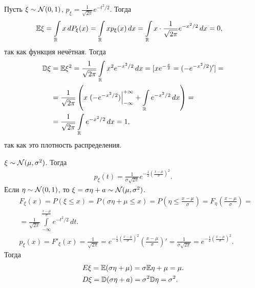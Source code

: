 \documentclass[../main.tex]{subfiles}
\begin{document}
\begin{exmpl}
 Пусть $ \xi \sim \mathcal N(0,1) $,  $ p_\xi = \frac{1}{\sqrt{2\pi}}e^{-t^{2} / 2} $. Тогда
 \begin{align*}
  \mathbb E\xi &= \int\limits_{\mathbb{R}} x\,dP_\xi(x) = \int\limits_{\mathbb{R}} x p_\xi(x)\,dx = \int\limits_{\mathbb{R}} x \cdot \frac{1}{\sqrt{2\pi}}      e^{-x^{2} / 2}\,dx = 0,
 \end{align*} так как функция нечётная. Тогда
 \begin{align*}
  \mathbb D\xi &= \mathbb E\xi^{2} = \frac{1}{\sqrt{2\pi}}\int\limits_{\mathbb{R}} x^{2} e^{-x^{2} / 2}\,dx = [xe^{-\frac{x}{2}} = (-e^{-x^{2} / 2})'] = \\
  &= \frac{1}{\sqrt{2\pi}} \left( x \left.(-e^{-x^{2} / 2})\right|_{-\infty}^{+\infty} + \int\limits_{\mathbb{R}} e^{-x^{2} / 2}\,dx  \right) = \\
   &= \frac{1}{\sqrt{2\pi}} \int\limits_{\mathbb{R}} e^{-x^{2} / 2} \,dx = 1,
 \end{align*} так как это плотность распределения.
\end{exmpl}
 
\begin{exmpl}
 $ \xi \sim \mathcal N(\mu,\sigma^{2}) $. Тогда
 \begin{align*}
  p_\xi(t) = \frac{1}{\sigma\sqrt{2\pi}} e^{-\frac{1}{2} \left( \frac{x-\mu}{\sigma} \right)^{2}}.
 \end{align*} Если $ \eta \sim \mathcal N(0,1) $, то $ \xi = \sigma \eta + a \sim \mathcal N(\mu,\sigma^{2}) $.
\begin{align*}
 &F_\xi(x) = P(\xi \leqslant x) = P(\sigma\eta + \mu \leqslant x) = P\left(\eta \leqslant \frac{x-\mu}{\sigma}\right) = F_{\eta}\left( \frac{x-\mu}{\sigma} \right) = \\
 &= \frac{1}{\sqrt{2\pi}} \int\limits_{-\infty}^{\frac{x-\mu}{\sigma}} e^{-t^{2} / 2}\,dt. \\
 &p_\xi(x) = F'_\xi(x) = \frac{1}{\sqrt{2\pi}} = e^{-\frac{1}{2} \left( \frac{x-\mu}{\sigma} \right)^{2}} \left( \frac{x-\mu}{\sigma} \right)' = \frac{1}{\sigma\sqrt{2\pi}} = e^{-\frac{1}{2} \left( \frac{x-\mu}{\sigma} \right)^{2}}.
\end{align*} Тогда
\begin{align*}
 &E\xi = \mathbb E(\sigma \eta + \mu)  = \sigma \mathbb E\eta + \mu = \mu.\\
 &D\xi = \mathbb D(\sigma\eta + a) = \sigma^{2}\mathbb D\eta = \sigma^{2}.
\end{align*} 
\end{exmpl}
\end{document}

